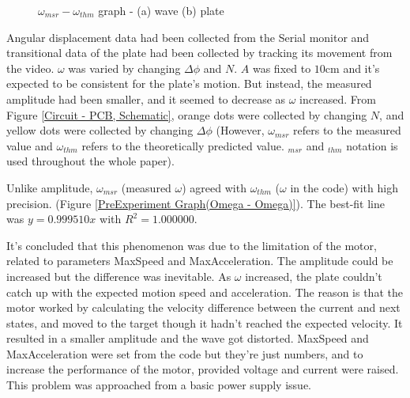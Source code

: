 \begin{figure}[H]
    \caption{$\omega_{msr} - \omega_{thm}$ graph - (a) wave (b) plate}
    \label{PreExperiment}
\end{figure}


Angular displacement data had been collected from the Serial monitor and transitional data of the plate had been collected by tracking its movement from the video. $\omega$ was varied by changing $\Delta\phi$ and $N$. $A$ was fixed to $10\mathrm{cm}$ and it's expected to be consistent for the plate's motion. But instead, the measured amplitude had been smaller, and it seemed to decrease as $\omega$ increased. From Figure \ref{Circuit - PCB, Schematic}, orange dots were collected by changing $N$, and yellow dots were collected by changing $\Delta\phi$ (However, $\omega_{msr}$ refers to the measured value and $\omega_{thm}$ refers to the theoretically predicted value. $_{msr}$ and $_{thm}$ notation is used throughout the whole paper).

Unlike amplitude, $\omega_{msr}$ (measured $\omega$) agreed with $\omega_{thm}$ ($\omega$ in the code) with high precision. (Figure \ref{PreExperiment Graph(Omega - Omega)}). The best-fit line was $y=0.999510x$ with $R^2 = 1.000000$.





It's concluded that this phenomenon was due to the limitation of the motor, related to parameters MaxSpeed and MaxAcceleration. The amplitude could be increased but the difference was inevitable. As $\omega$ increased, the plate couldn't catch up with the expected motion speed and acceleration. The reason is that the motor worked by calculating the velocity difference between the current and next states, and moved to the target though it hadn't reached the expected velocity. It resulted in a smaller amplitude and the wave got distorted. MaxSpeed and MaxAcceleration were set from the code but they're just numbers, and to increase the performance of the motor, provided voltage and current were raised. This problem was approached from a basic power supply issue.

